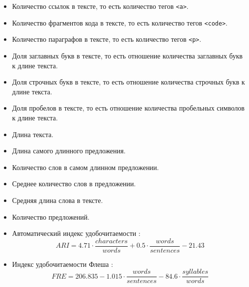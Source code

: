 \documentclass[../diploma.tex]{subfiles}
\begin{document}
   	\begin{itemize}
   		\item
   		Количество ссылок в тексте, то есть количество тегов \texttt{<a>}.

   		\item
   		Количество фрагментов кода в тексте, то есть количество тегов \texttt{<code>}.

   		\item
   		Количество параграфов в тексте, то есть количество тегов \texttt{<p>}.

   		\item
   		Доля заглавных букв в тексте, то есть отношение количества заглавных букв к длине текста.

   		\item
   		Доля строчных букв в тексте, то есть отношение количества строчных букв к длине текста.

   		\item
   		Доля пробелов в тексте, то есть отношение количества пробельных символов к длине текста.

   		\item
   		Длина текста.

   		\item
   		Длина самого длинного предложения.

   		\item
   		Количество слов в самом длинном предложении.

   		\item
   		Среднее количество слов в предложении.

   		\item
   		Средняя длина слова в тексте.

   		\item
   		Количество предложений.

   		\item
   		Автоматический индекс удобочитаемости \cite{article:ari}: 
   		\begin{equation} 
   			ARI = 4.71 \cdot \frac{characters}{words} + 0.5 \cdot \frac{words}{sentences} - 21.43
   		\end{equation}

   		\item
   		Индекс удобочитаемости Флеша \cite{article:fre}: 
   		\begin{equation} 
   			FRE = 206.835 - 1.015 \cdot \frac{words}{sentences} - 84.6 \cdot \frac{syllables}{words}
   		\end{equation}


\end{itemize}
\end{document}
